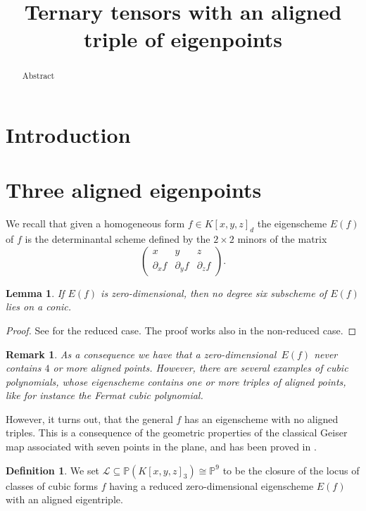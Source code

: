 \documentclass{amsart}
\title{Ternary tensors with an aligned triple of eigenpoints}
\author{}
\date{}
\theoremstyle{plain}
\newtheorem{lem}[theorem]{Lemma}
\newtheorem{rmk}[theorem]{Remark}
\theoremstyle{definition}
\newtheorem{definition}[theorem]{Definition}
\newcommand{\p}{\mathbb{P}}
\newcommand{\de}{\partial}
\begin{document}
\maketitle
\begin{abstract}
Abstract
\end{abstract}

\section{Introduction}
\section{Three aligned eigenpoints}
We recall that given a homogeneous form $f\in K[x,y,z]_d$ the eigenscheme $E(f)$ of $f$ is the determinantal scheme defined by the $2\times 2 $ minors of the matrix
%
\begin{equation} 
\label{eq:def_matrix}
    \begin{pmatrix}
    x & y & z \\
    \de_x f & \de_y f & \de_z f
    \end{pmatrix}.
\end{equation}
%   
\begin{lem}
If $E(f)$ is zero-dimensional, then
no degree six subscheme of $E(f)$ lies on a conic.
\end{lem}
\begin{proof}
See \cite[Lemma~9.1]{OS1} for the reduced case. The proof works also in the non-reduced case.
\end{proof}


\begin{rmk}
As a consequence we have that a zero-dimensional~$E(f)$ never contains $4$ or more aligned points. However, there are several examples of cubic polynomials, whose eigenscheme contains one or more triples of aligned points, like for instance the Fermat cubic polynomial.
\end{rmk}
However, it turns out, that the general $f$ has an eigenscheme with no aligned triples. This is a consequence of the geometric properties of the classical Geiser map associated with seven points in the plane, and has been proved in \cite[Proposition 4.5]{BGV}.

\begin{definition}
 We set $\mathcal{L} \subseteq \p(K[x,y,z]_3) \cong \p^9$ to be the closure of the locus of classes of cubic forms $f$ having a reduced zero-dimensional eigenscheme $E(f)$ with an aligned eigentriple.
\end{definition}
\end{document}
